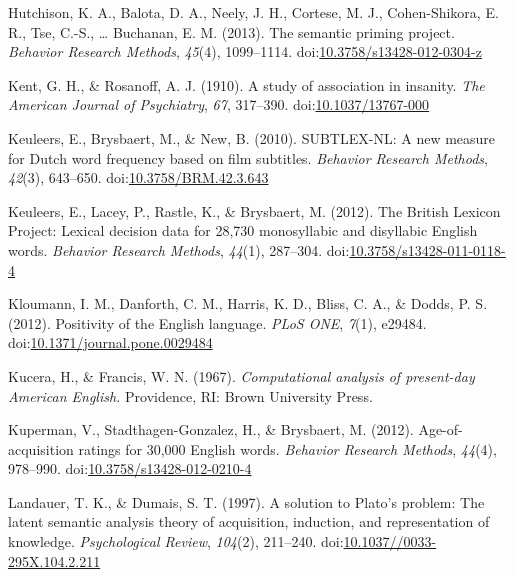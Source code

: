 \documentclass[english,man]{apa6}
\theoremstyle{definition}
\theoremstyle{definition}
\theoremstyle{definition}
\theoremstyle{remark}
\begin{document}
\hypertarget{ref-Hutchison2013}{}
Hutchison, K. A., Balota, D. A., Neely, J. H., Cortese, M. J.,
Cohen-Shikora, E. R., Tse, C.-S., \ldots{} Buchanan, E. M. (2013). The
semantic priming project. \emph{Behavior Research Methods},
\emph{45}(4), 1099--1114.
doi:\href{https://doi.org/10.3758/s13428-012-0304-z}{10.3758/s13428-012-0304-z}

\hypertarget{ref-Kent1910}{}
Kent, G. H., \& Rosanoff, A. J. (1910). A study of association in
insanity. \emph{The American Journal of Psychiatry}, \emph{67},
317--390.
doi:\href{https://doi.org/10.1037/13767-000}{10.1037/13767-000}

\hypertarget{ref-Keuleers2010}{}
Keuleers, E., Brysbaert, M., \& New, B. (2010). SUBTLEX-NL: A new
measure for Dutch word frequency based on film subtitles. \emph{Behavior
Research Methods}, \emph{42}(3), 643--650.
doi:\href{https://doi.org/10.3758/BRM.42.3.643}{10.3758/BRM.42.3.643}

\hypertarget{ref-Keuleers2012}{}
Keuleers, E., Lacey, P., Rastle, K., \& Brysbaert, M. (2012). The
British Lexicon Project: Lexical decision data for 28,730 monosyllabic
and disyllabic English words. \emph{Behavior Research Methods},
\emph{44}(1), 287--304.
doi:\href{https://doi.org/10.3758/s13428-011-0118-4}{10.3758/s13428-011-0118-4}

\hypertarget{ref-Kloumann2012}{}
Kloumann, I. M., Danforth, C. M., Harris, K. D., Bliss, C. A., \& Dodds,
P. S. (2012). Positivity of the English language. \emph{PLoS ONE},
\emph{7}(1), e29484.
doi:\href{https://doi.org/10.1371/journal.pone.0029484}{10.1371/journal.pone.0029484}

\hypertarget{ref-Kucera1967}{}
Kucera, H., \& Francis, W. N. (1967). \emph{Computational analysis of
present-day American English.} Providence, RI: Brown University Press.

\hypertarget{ref-Kuperman2012}{}
Kuperman, V., Stadthagen-Gonzalez, H., \& Brysbaert, M. (2012).
Age-of-acquisition ratings for 30,000 English words. \emph{Behavior
Research Methods}, \emph{44}(4), 978--990.
doi:\href{https://doi.org/10.3758/s13428-012-0210-4}{10.3758/s13428-012-0210-4}

\hypertarget{ref-Landauer1997}{}
Landauer, T. K., \& Dumais, S. T. (1997). A solution to Plato's problem:
The latent semantic analysis theory of acquisition, induction, and
representation of knowledge. \emph{Psychological Review}, \emph{104}(2),
211--240.
doi:\href{https://doi.org/10.1037//0033-295X.104.2.211}{10.1037//0033-295X.104.2.211}
\end{document}
